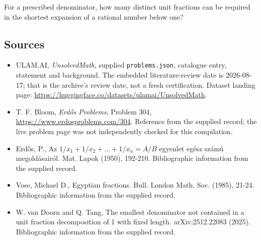 \documentclass[11pt,a4paper]{article}
\begin{document}
For a prescribed denominator, how many distinct unit fractions can be required in the shortest expansion of a rational number below one?

\subsection{Sources}

{\small

\begin{itemize}

\item[\hypertarget{source:statement:1}{S1}] ULAM.AI, \emph{UnsolvedMath}, supplied \texttt{problems.json}, catalogue entry, statement and background. The embedded literature-review date is 2026-08-17; that is the archive’s review date, not a fresh certification. Dataset landing page: \url{https://huggingface.co/datasets/ulamai/UnsolvedMath}.

\item[\hypertarget{source:statement:2}{S2}] T. F. Bloom, \emph{Erdős Problems}, Problem 304, \url{https://www.erdosproblems.com/304}. Reference from the supplied record; the live problem page was not independently checked for this compilation.

\item[\hypertarget{source:statement:3}{S3}] Erd\H{o}s, P., Az $1/x_1 + 1/x_2 + \ldots + 1/x_n =A/B$ egyenlet eg\'{e}sz sz\'{a}m\'{u} megold\'{a}sair\'{o}l. Mat. Lapok (1950), 192-210. Bibliographic information from the supplied record.

\item[\hypertarget{source:statement:4}{S4}] Vose, Michael D., Egyptian fractions. Bull. London Math. Soc. (1985), 21-24. Bibliographic information from the supplied record.

\item[\hypertarget{source:statement:5}{S5}] W. van Doorn and Q. Tang, The smallest denominator not contained in a unit fraction decomposition of 1 with fixed length. arXiv:2512.22083 (2025). Bibliographic information from the supplied record.

\end{itemize}

}

\label{end:statement}
\end{document}
